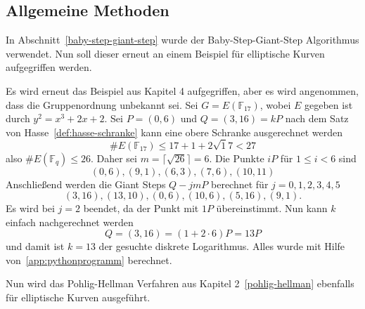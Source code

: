 \subsection{Allgemeine Methoden}
In Abschnitt~\ref{baby-step-giant-step} wurde der Baby-Step-Giant-Step Algorithmus verwendet. Nun soll dieser erneut an einem Beispiel für elliptische Kurven aufgegriffen werden.
\begin{beispiel}
    Es wird erneut das Beispiel aus Kapitel 4 aufgegriffen, aber es wird angenommen, dass die Gruppenordnung unbekannt sei. Sei $G=E(\mathbb{F}_{17})$, wobei $E$ gegeben ist durch $y^2=x^3+2x+2$. Sei $P=(0,6)$ und $Q=(3, 16)=kP$ nach dem Satz von Hasse~\ref{def:hasse-schranke} kann eine obere Schranke ausgerechnet werden
    \[
        \#E(\mathbb{F}_{17})\leq 17+1+ 2\sqrt 17< 27
    \]
    also \(\#E(\mathbb{F}_q)\leq 26\). Daher sei $m=\lceil \sqrt{26}\rceil=6$. Die Punkte $iP$ für $1\leq i< 6$ sind
    \[
        (0, 6), (9, 1), (6, 3), (7, 6), (10, 11)
    \]
    Anschließend werden die Giant Steps $Q-jmP$ berechnet für $j=0,1,2,3,4,5$
    \[
        (3,16),(13,10),(0, 6),(10,6),(5,16),(9,1).
    \]
    Es wird bei $j=2$ beendet, da der Punkt mit $1P$ übereinstimmt. Nun kann $k$ einfach nachgerechnet werden
    \[
        Q=(3,16)=(1+2\cdot6)P= 13P
    \]
    und damit ist $k=13$ der gesuchte diskrete Logarithmus. Alles wurde mit Hilfe von~\ref{app:pythonprogramm} berechnet.
\end{beispiel}
Nun wird das Pohlig-Hellman Verfahren aus Kapitel 2~\ref{pohlig-hellman} ebenfalls für elliptische Kurven ausgeführt.
